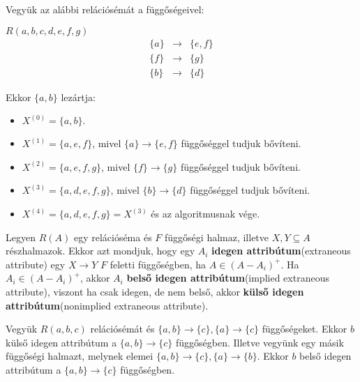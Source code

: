\begin{pld}
Vegyük az alábbi relációsémát a függőségeivel:
\begin{center}
    $R(a,b,c,d,e,f,g)$ \break
    $$
    \begin{matrix}
    \{a\} & \longrightarrow & \{e,f\} \\
    \{f\} & \longrightarrow & \{g\} \\
    \{b\} & \longrightarrow & \{d\}
    \end{matrix}
    $$
    
\end{center}
Ekkor $\{a,b\}$ lezártja:
\begin{itemize}
    \item $X^{(0)} = \{a,b\}.$
    \item $X^{(1)} = \{a,e,f\}$, mivel $\{a\} \longrightarrow \{e,f\}$ függőséggel tudjuk bővíteni.
    \item $X^{(2)} = \{a,e,f,g\}$, mivel $\{f\} \longrightarrow \{g\}$ függőséggel tudjuk bővíteni.
    \item $X^{(3)} = \{a,d,e,f,g\}$, mivel $\{b\} \longrightarrow \{d\}$ függőséggel tudjuk bővíteni.
    \item $X^{(4)} = \{a,d,e,f,g\} = X^{(3)}$ és az algoritmusnak vége.
\end{itemize}
\end{pld}

\begin{defi}
Legyen $R(A)$ egy relációséma és $F$ függőségi halmaz, illetve $X,Y \subseteq A$ részhalmazok. Ekkor azt mondjuk, hogy egy $A_i$ \textbf{idegen attribútum}(extraneous attribute) egy $X \longrightarrow Y$ $F$ feletti függőségben, ha $A \in (A-A_i)^+$. Ha $A_i \in (A-A_i)^+$, akkor $A_i$ \textbf{belső idegen attribútum}(implied extraneous attribute), viszont ha csak idegen, de nem belső, akkor \textbf{külső idegen attribútum}(nonimplied extraneous attribute).
\end{defi}

\begin{pld}
Vegyük $R(a,b,c)$ relációsémát és $\{a,b\} \longrightarrow \{c\}, \{a\} \longrightarrow \{c\}$ függőségeket. Ekkor $b$ külső idegen attribútum a $\{a,b\} \longrightarrow \{c\}$ függőségben. \hfill \break
Illetve vegyünk egy másik függőségi halmazt, melynek elemei $\{a,b\} \longrightarrow \{c\}, \{a\} \longrightarrow \{b\}$. Ekkor $b$ belső idegen attribútum a $\{a,b\} \longrightarrow \{c\}$ függőségben.
\end{pld}

